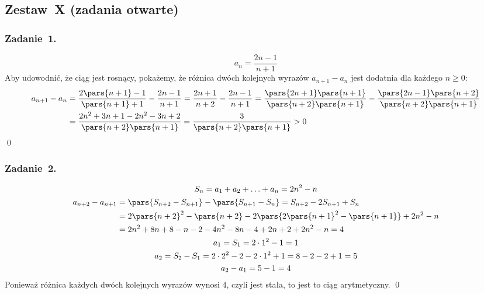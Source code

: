 \subsection*{Zestaw~X (zadania otwarte)}
\subsubsection*{Zadanie~1.}
\begin{equation*}
    a_n = \frac{2n - 1}{n + 1}
\end{equation*}
Aby udowodnić, że ciąg jest rosnący, pokażemy, że różnica dwóch kolejnych wyrazów \(a_{n + 1} - a_n\) jest dodatnia dla każdego \(n \geq 0\):
\begin{equation*}
    \begin{split}
        a_{n + 1} - a_n
            &= \frac{2\pars{n + 1} - 1}{\pars{n + 1} + 1} - \frac{2n - 1}{n + 1}
            = \frac{2n + 1}{n + 2} - \frac{2n - 1}{n + 1}
            = \frac{\pars{2n + 1}\pars{n + 1}}{\pars{n + 2}\pars{n + 1}} - \frac{\pars{2n - 1}\pars{n + 2}}{\pars{n + 2}\pars{n + 1}}\\
            &= \frac{2n^2 + 3n + 1 - 2n^2 - 3n + 2}{\pars{n + 2}\pars{n + 1}}
            = \frac{3}{\pars{n + 2}\pars{n + 1}}
            > 0
    \end{split}
\end{equation*}
\qed
\subsubsection*{Zadanie~2.}
\begin{gather*}
    S_n = a_1 + a_2 + \ldots + a_n = 2n^2 - n\\
    \begin{split}
        a_{n + 2} - a_{n + 1}
            &= \pars{S_{n + 2} - S_{n + 1}} - \pars{S_{n + 1} - S_n}
            = S_{n + 2} - 2S_{n + 1} + S_n\\
            &= 2\pars{n + 2}^2 - \pars{n + 2} - 2\pars{2\pars{n + 1}^2 - \pars{n + 1}} + 2n^2 - n\\
            &= 2n^2 + 8n + 8 - n - 2 - 4n^2 - 8n - 4 + 2n + 2 + 2n^2 - n
            = 4
    \end{split}\\
    a_1 = S_1 = 2 \cdot 1^2 - 1 = 1\\
    a_2 = S_2 - S_1 = 2 \cdot 2^2 - 2 - 2 \cdot 1^2 + 1 = 8 - 2 - 2 + 1 = 5\\
    a_2 - a_1 = 5 - 1 = 4
\end{gather*}
Ponieważ różnica każdych dwóch kolejnych wyrazów wynosi \(4\), czyli jest stała, to jest to ciąg arytmetyczny.
\qed
